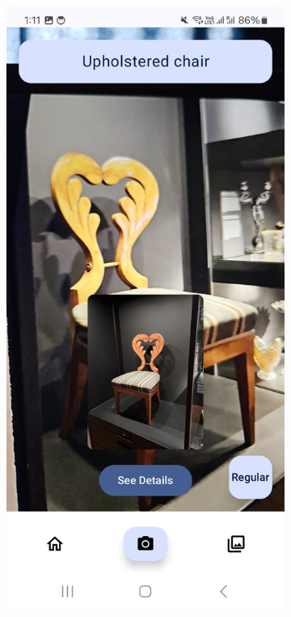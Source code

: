 \begin{figure}[h]
    \vspace{1em}

    \begin{subfigure}[b]{0.3\textwidth}
        \centering
        \includegraphics[width=\textwidth]{img/classification-preview-screen.jpg}

\end{subfigure}
\end{figure}
